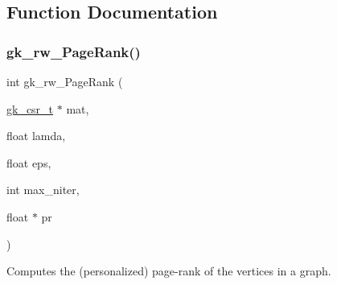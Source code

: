 \subsection{Function Documentation}
\mbox{\label{a00134_a5f79542ae883d026565a71bab5bca8d4}} 
\subsubsection{\texorpdfstring{gk\+\_\+rw\+\_\+\+Page\+Rank()}{gk\_rw\_PageRank()}}
{\footnotesize\ttfamily int gk\+\_\+rw\+\_\+\+Page\+Rank (\begin{DoxyParamCaption}\item[{\hyperlink{a00634}{gk\+\_\+csr\+\_\+t} $\ast$}]{mat,  }\item[{float}]{lamda,  }\item[{float}]{eps,  }\item[{int}]{max\+\_\+niter,  }\item[{float $\ast$}]{pr }\end{DoxyParamCaption})}

Computes the (personalized) page-\/rank of the vertices in a graph.


